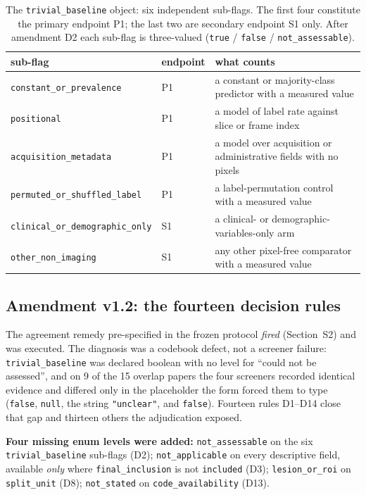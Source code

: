 \documentclass[11pt,a4paper]{article}
\begin{document}
\begin{table}[htbp]
\centering
\caption{The \texttt{trivial\_baseline} object: six independent sub-flags. The first
four constitute the primary endpoint P1; the last two are secondary endpoint S1 only.
After amendment D2 each sub-flag is three-valued (\texttt{true} / \texttt{false} /
\texttt{not\_assessable}).}
\footnotesize
\begin{tabular}{@{}L{4.9cm}lL{7.2cm}@{}}
\toprule
sub-flag & endpoint & what counts \\
\midrule
\texttt{constant\_or\_prevalence}      & P1 & a constant or majority-class predictor with a measured value \\
\texttt{positional}                    & P1 & a model of label rate against slice or frame index \\
\texttt{acquisition\_metadata}         & P1 & a model over acquisition or administrative fields with no pixels \\
\texttt{permuted\_or\_shuffled\_label} & P1 & a label-permutation control with a measured value \\
\midrule
\texttt{clinical\_or\_demographic\_only} & S1 & a clinical- or demographic-variables-only arm \\
\texttt{other\_non\_imaging}             & S1 & any other pixel-free comparator with a measured value \\
\bottomrule
\end{tabular}
\end{table}

\subsection{Amendment v1.2: the fourteen decision rules}

The agreement remedy pre-specified in the frozen protocol \emph{fired} (Section~S2)
and was executed. The diagnosis was a codebook defect, not a screener failure:
\texttt{trivial\_baseline} was declared boolean with no level for ``could not be
assessed'', and on 9 of the 15 overlap papers the four screeners recorded identical
evidence and differed only in the placeholder the form forced them to type
(\texttt{false}, \texttt{null}, the string \texttt{"unclear"}, and \texttt{false}).
Fourteen rules D1--D14 close that gap and thirteen others the adjudication exposed.

\textbf{Four missing enum levels were added:} \texttt{not\_assessable} on the six
\texttt{trivial\_baseline} sub-flags (D2); \texttt{not\_applicable} on every
descriptive field, available \emph{only} where \texttt{final\_inclusion} is not
\texttt{included} (D3); \texttt{lesion\_or\_roi} on \texttt{split\_unit} (D8);
\texttt{not\_stated} on \texttt{code\_availability} (D13).
\end{document}
